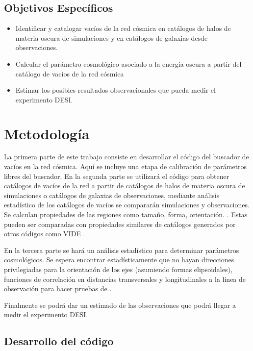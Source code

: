 \documentclass[preprint]{aastex62}
\begin{document}
  \subsection{Objetivos Específicos}

  \begin{itemize}

      \item Identificar y catalogar vacíos de la red cósmica en catálogos de halos de materia oscura de
  simulaciones y en catálogos de galaxias desde observaciones.

      \item Calcular el parámetro cosmológico asociado a la energía oscura a partir del catálogo de
  vacíos de la red cósmica

    \item  Estimar los posibles resultados observacionales que pueda medir el experimento DESI.
  \end{itemize}
  
  \section{Metodología}

  La primera parte de este trabajo consiste en desarrollar el código del buscador de vacíos
  en la red cósmica. Aquí se incluye una etapa de calibración de parámetros libres del buscador.
  En la segunda parte se utilizará el código para obtener catálogos
  de vacíos de la red a partir de catálogos de halos de materia oscura de simulaciones o
  catálogos de galaxias de observaciones, mediante análisis estadístico de los catálogos de
  vacíos se compararán simulaciones y observaciones.
  Se calculan propiedades de las regiones como tamaño, forma, orientación. \citep{El-Ad1997}.
  Estas pueden ser comparadas con propiedades similares de catálogos generados por otros códigos
  como VIDE \citep{Sutter2015}.

  En la tercera parte se hará un análisis estadístico para determinar parámetros cosmológicos.
  Se espera encontrar estadísticamente que no hayan direcciones privilegiadas para la orientación
  de los ejes (asumiendo formas elipsoidales), funciones de correlación en distancias transversales
  y longitudinales a la línea de observación para hacer pruebas de \citet{AlcockPaczynski1979}.
  
  Finalmente se podrá dar un estimado de las observaciones que podrá llegar a medir el
  experimento DESI.

  \subsection{Desarrollo del código}
\end{document}

